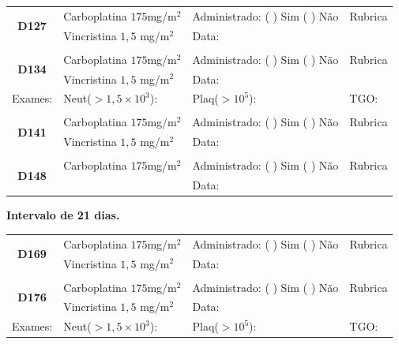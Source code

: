 \documentclass[11pt,a4paper,oldfontcommands]{memoir}
\begin{document}
\begin{center}
\begin{table}[H]
\begin{tabular}{p{1.3cm}p{4.9cm}|p{4.7cm}|p{3cm}}
    \hline
    \multicolumn{1}{c|}{\multirow{2}{*}{\textbf{D127}}}&{Carboplatina \(175\)mg/m\(^2\)}&{Administrado: (  ) Sim (  ) Não}&{Rubrica}\\
    \multicolumn{1}{c|}{}&{Vincristina \(1,5\) mg/m\(^2\)}&{Data:}&\\
    \hline
    \\
    \hline
    \multicolumn{1}{c|}{\multirow{2}{*}{\textbf{D134}}}&{Carboplatina \(175\)mg/m\(^2\)}&{Administrado: (  ) Sim (  ) Não}&{Rubrica}\\
    \multicolumn{1}{c|}{}&{Vincristina \(1,5\) mg/m\(^2\)}&{Data:}&\\
    \hline
    \multicolumn{1}{c|}{Exames:}&{Neut(\(>1,5\times10^3\)):}&{Plaq(\(>10^5\)):}&{TGO:}
    \\
    \hline
    \\
    \hline
    \multicolumn{1}{c|}{\multirow{2}{*}{\textbf{D141}}}&{Carboplatina \(175\)mg/m\(^2\)}&{Administrado: (  ) Sim (  ) Não}&{Rubrica}\\
    \multicolumn{1}{c|}{}&{Vincristina \(1,5\) mg/m\(^2\)}&{Data:}&\\
    \hline
    \\
    \hline
    \multicolumn{1}{c|}{\multirow{2}{*}{\textbf{D148}}}&{Carboplatina \(175\)mg/m\(^2\)}&{Administrado: (  ) Sim (  ) Não}&{Rubrica}\\
	\multicolumn{1}{c|}{}&&{Data:}&\\
    \hline
\end{tabular}
\end{table}
\textbf{Intervalo de 21 dias.}
\begin{table}[H]
\begin{tabular}{p{1.3cm}p{4.9cm}|p{4.7cm}|p{3cm}}
    \hline
    \multicolumn{1}{c|}{\multirow{2}{*}{\textbf{D169}}}&{Carboplatina \(175\)mg/m\(^2\)}&{Administrado: (  ) Sim (  ) Não}&{Rubrica}\\
    \multicolumn{1}{c|}{}&{Vincristina \(1,5\) mg/m\(^2\)}&{Data:}&\\
    \hline
    \\
    \hline
    \multicolumn{1}{c|}{\multirow{2}{*}{\textbf{D176}}}&{Carboplatina \(175\)mg/m\(^2\)}&{Administrado: (  ) Sim (  ) Não}&{Rubrica}\\
    \multicolumn{1}{c|}{}&{Vincristina \(1,5\) mg/m\(^2\)}&{Data:}&\\
    \hline
    \multicolumn{1}{c|}{Exames:}&{Neut(\(>1,5\times10^3\)):}&{Plaq(\(>10^5\)):}&{TGO:}

\end{tabular}
\end{table}
\end{center}
\end{document}
